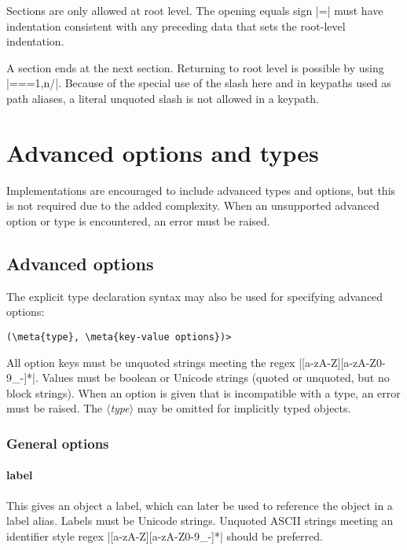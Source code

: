 \documentclass[11pt]{article}
\newcommand{\meta}[1]{\ensuremath{\langle}\textit{#1}\ensuremath{\rangle}}
\newcommand{\vmeta}[1]{{\color{DarkRed}\ensuremath{\langle}\textit{#1}\ensuremath{\rangle}}}
\begin{document}
{{Sections are only allowed at root level.  The opening equals sign |=| must have indentation consistent with any preceding data that sets the root-level indentation.

A section ends at the next section.  Returning to root level is possible by using |==={1,n}/|.  Because of the special use of the slash here and in keypaths used as path aliases, a literal unquoted slash is not allowed in a keypath.



\section{Advanced options and types}
\label{sec:advanced-options}

Implementations are encouraged to include advanced types and options, but this is not required due to the added complexity.  When an unsupported advanced option or type is encountered, an error must be raised.

\subsection{Advanced options}

The explicit type declaration syntax may also be used for specifying advanced options:
\begin{Verbatim}[commandchars=\\\{\}]
(\meta{type}, \meta{key-value options})>
\end{Verbatim}
All option keys must be unquoted strings meeting the regex |[a-zA-Z][a-zA-Z0-9_-]*|.  Values must be boolean or Unicode strings (quoted or unquoted, but no block strings).  When an option is given that is incompatible with a type, an error must be raised.  The \vmeta{type} may be omitted for implicitly typed objects.


\subsubsection{General options}

\paragraph{label}
This gives an object a label, which can later be used to reference the object in a label alias.  Labels must be Unicode strings.  Unquoted ASCII strings meeting an identifier style regex |[a-zA-Z][a-zA-Z0-9_-]*| should be preferred.


}}
\end{document}
